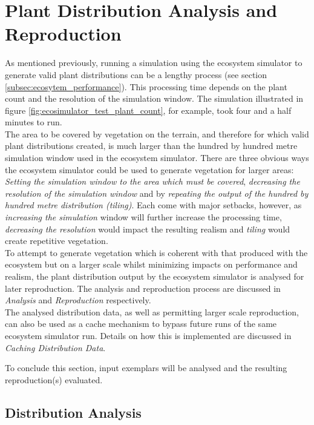 \section{Plant Distribution Analysis and Reproduction}

As mentioned previously, running a simulation using the ecosystem simulator to generate valid plant distributions can be a lengthy process (see section \ref{subsec:ecosytem_performance}). This processing time depends on the plant count and the resolution of the simulation window. The simulation illustrated in figure \ref{fig:ecosimulator_test_plant_count}, for example, took four and a half minutes to run.\\

The area to be covered by vegetation on the terrain, and therefore for which valid plant distributions created, is much larger than the hundred by hundred metre simulation window used in the ecosystem simulator. There are three obvious ways the ecosystem simulator could be used to generate vegetation for larger areas: \textit{Setting the simulation window to the area which must be covered}, \textit{decreasing the resolution of the simulation window} and by \textit{repeating the output of the hundred by hundred metre distribution (tiling)}. Each come with major setbacks, however, as \textit{increasing the simulation} window will further increase the processing time, \textit{decreasing the resolution} would impact the resulting realism and \textit{tiling} would create repetitive vegetation.\\

To attempt to generate vegetation which is coherent with that produced with the ecosystem but on a larger scale whilst minimizing impacts on performance and realism, the plant distribution output by the ecosystem simulator is analysed for later reproduction. The analysis and reproduction process are discussed in \textit{Analysis} and \textit{Reproduction} respectively.\\

The analysed distribution data, as well as permitting larger scale reproduction, can also be used as a cache mechanism to bypass future runs of the same ecosystem simulator run. Details on how this is implemented are discussed in \textit{Caching Distribution Data}.

To conclude this section, input exemplars will be analysed and the resulting reproduction(s) evaluated.

\subsection{Distribution Analysis}

